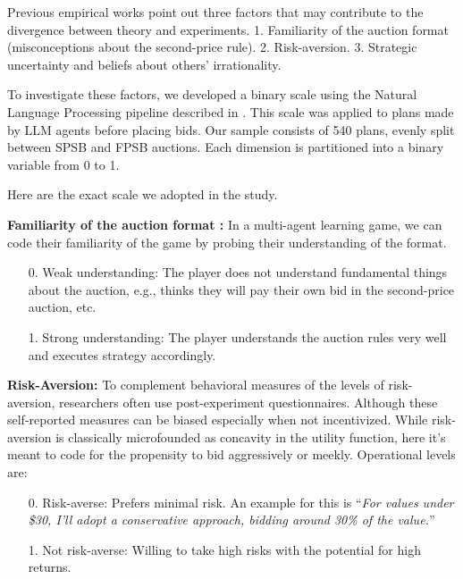 \documentclass{article} %
\begin{document}

Previous empirical works point out three factors that may contribute to the divergence between theory and experiments.
1. Familiarity of the auction format (misconceptions about the second-price rule).
2. Risk-aversion. 
3. Strategic uncertainty and beliefs about others' irrationality.


To investigate these factors, we developed a binary scale using the Natural Language Processing pipeline described in \cite{Horton2024EDSL}. 
This scale was applied to plans made by LLM agents before placing bids. 
Our sample consists of 540 plans, evenly split between SPSB and FPSB auctions. 
Each dimension is partitioned into a binary variable from 0 to 1.

Here are the exact scale we adopted in the study.

\textbf{Familiarity of the auction format :}
In a multi-agent learning game, we can code their familiarity of the game by probing their understanding of the format.

\begin{enumerate}
    \item[0.] Weak understanding: The player does not understand fundamental things about the auction, e.g., thinks they will pay their own bid in the second-price auction, etc.
    \item[1.]  Strong understanding: The player understands the auction rules very well and executes strategy accordingly.
\end{enumerate}






\textbf{Risk-Aversion:} 
To complement behavioral measures of the levels of risk-aversion, researchers often use post-experiment questionnaires.
Although these self-reported measures can be biased especially when not incentivized. 
While risk-aversion is classically microfounded as concavity in the utility function, here it's meant to code for the propensity to bid aggressively or meekly. Operational levels are: 
\begin{enumerate}
    \item[0.] Risk-averse: Prefers minimal risk.
    An example for this is ``\textit{For values under \$30, I'll adopt a conservative approach, bidding around 30\% of the value.}''
    \item[1. ] Not risk-averse: Willing to take high risks with the potential for high returns.        
\end{enumerate}
\end{document}
